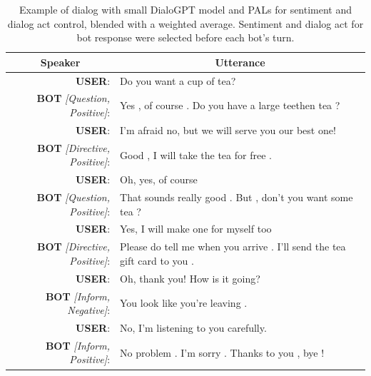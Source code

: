 \documentclass[11pt]{article}
\begin{document}
\begin{table}[]
\begin{tabular}{rl}
\multicolumn{1}{c}{Speaker}    & \multicolumn{1}{c}{Utterance}                                            \\ \hline
\textbf{USER}:                          & Do you want a cup of tea?                                                \\
\textbf{BOT} \textit{{[}Question, Positive{]}}:  & Yes , of course . Do you have a large teethen tea ?                      \\
\textbf{USER}:                          & I'm afraid no, but we will serve you our best one!                       \\
\textbf{BOT} \textit{{[}Directive, Positive{]}}: & Good , I will take the tea for free .                                    \\
\textbf{USER}:                          & Oh, yes, of course                                                       \\
\textbf{BOT} \textit{{[}Question, Positive{]}}:  & That sounds really good . But , don't you want some tea ?                \\
\textbf{USER}:                          & Yes, I will make one for myself too                                      \\
\textbf{BOT} \textit{{[}Directive, Positive{]}}: & Please do tell me when you arrive . I'll send the tea gift card to you . \\
\textbf{USER}:                          & Oh, thank you! How is it going?                                          \\
\textbf{BOT} \textit{{[}Inform, Negative{]}}:    & You look like you're leaving .                                           \\
\textbf{USER}:                          & No, I'm listening to you carefully.                                      \\
\textbf{BOT} \textit{{[}Inform, Positive{]}}:    & No problem . I'm sorry . Thanks to you , bye !                          
\end{tabular}
\caption{Example of dialog with small DialoGPT model and PALs for sentiment and dialog act control, blended with a weighted average. Sentiment and dialog act for bot response were selected before each bot's turn.}
\label{tab:tea_example_dialog}
\end{table}
\end{document}
